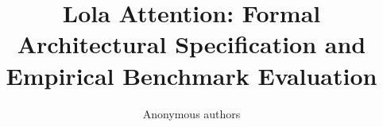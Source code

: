 \title{\textbf{Lola Attention: Formal Architectural Specification and Empirical Benchmark Evaluation}}

\author{Anonymous authors}
